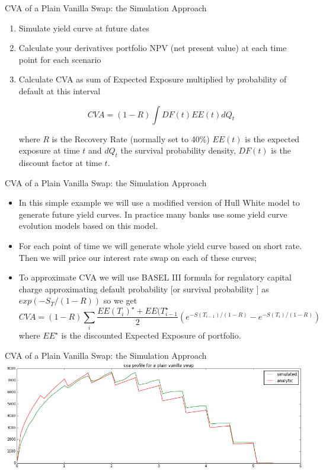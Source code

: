 \documentclass[11pt]{beamer}
\begin{document}
\begin{frame}{CVA of a Plain Vanilla Swap: the Simulation Approach}
\begin{enumerate}
\item Simulate yield curve at future dates
\item Calculate your derivatives portfolio NPV (net present value) at each time point for each scenario
\item Calculate CVA as sum of Expected Exposure multiplied by probability of default at this interval

$$ CVA=(1-R) \int DF(t)EE(t)dQ_t $$

where $R$ is the Recovery Rate (normally set to 40\%) $EE(t)$ is the expected exposure at time $t$ and $dQ_t$ the survival probability density, $DF(t)$ is the discount factor at time $t$.

\end{enumerate}
\end{frame}
\begin{frame}{CVA of a Plain Vanilla Swap: the Simulation Approach}
\begin{itemize}
\item In this simple example we will use a modified version of Hull White model to generate future yield curves. In practice many banks use some yield curve evolution models based on this model. 
\item For each point of time we will generate whole yield curve based on short rate. Then we will price our interest rate swap on each of these curves;
\item To approximate CVA we will use BASEL III formula for regulatory capital charge approximating default probability [or survival probability ] as $exp(-S_T/(1-R))$ so we get
\footnotesize
$$
CVA=(1-R) \sum\limits_i \frac{EE(T_i)^\star + EE(T_{i-1}^\star}{2}
\left( e^{-S(T_{i-1})/(1-R)}-e^{-S(T_i)/(1-R)} \right)
$$
\normalsize
where $EE^\star$ is the discounted Expected Exposure of portfolio.
\end{itemize}
\end{frame}
\begin{frame}{CVA of a Plain Vanilla Swap: the Simulation Approach}
\includegraphics[scale=.4]{img/profilo_2.png} 
\end{frame}
\end{document}
